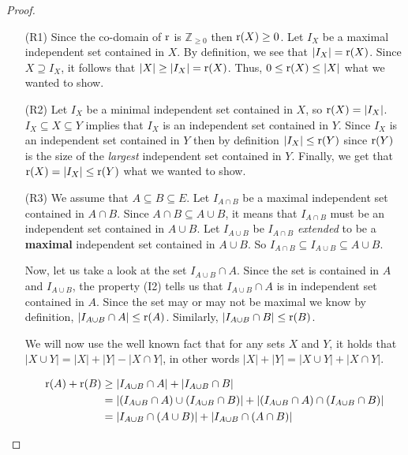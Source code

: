 \begin{proof}
    \begin{enumerate}
        \item[(R1)] Since the co-domain of $\operatorname{r}$ is $\mathbb{Z}_{\geq0}$ then  $\operatorname{r}(X) \geq 0$. Let $I_X$ be a maximal independent set contained in $X$. By definition, we see that $|I_X|=\operatorname{r}(X)$. Since $X\supseteq I_X$, it follows that $|X| \geq |I_X| = \operatorname{r}(X)$.       Thus, $0\leq\operatorname{r}(X)\leq|X|$ what we wanted to show.
        
        \item[(R2)] Let $I_X$ be a minimal independent set contained in $X$, so $\operatorname{r}(X)=|I_X|$. $I_X\subseteq X\subseteq Y$ implies that $I_X$ is an independent set contained in $Y$. Since $I_X$ is an independent set contained in $Y$ then by definition $|I_X|\leq \operatorname{r}(Y)$ since $\operatorname{r}(Y)$ is the size of the \textit{largest} independent set contained in $Y$. Finally, we get that $\operatorname{r}(X)=|I_X|\leq \operatorname{r}(Y)$ what we wanted to show.
        
        \item[(R3)] We assume that $A\subseteq B\subseteq E$. Let $I_{A\cap B}$ be a maximal independent set contained in $A\cap B$. Since $A\cap B\subseteq A\cup B$, it means that $I_{A\cap B}$ must be an independent set contained in $A\cup B$. Let $I_{A\cup B}$ be $I_{A\cap B}$ \textit{extended} to be a \textbf{maximal} independent set contained in $A\cup B$. So $I_{A\cap B}\subseteq I_{A\cup B} \subseteq A\cup B$. 
        
        Now, let us take a look at the set $I_{A\cup B}\cap A$. Since the set is contained in $A$ and $I_{A\cup B}$, the property (I2) tells us that $I_{A\cup B}\cap A$ is in independent set contained in $A$. Since the set may or may not be maximal we know by definition, $|I_{A\cup B}\cap A|\leq \operatorname{r}(A)$. Similarly, $|I_{A\cup B}\cap B|\leq \operatorname{r}(B) $.

        We will now use the well known fact that for any sets $X$ and $Y$, it holds that $|X\cup Y|=|X|+|Y|-|X\cap Y|$, in other words $|X|+|Y|=|X\cup Y|+|X\cap Y|$.
        
        \begin{align*}
            \operatorname{r}(A)+\operatorname{r}(B) &\geq |I_{A\cup B}\cap A|+|I_{A\cup B}\cap B| 
            \\&=  |(I_{A\cup B}\cap A)\cup(I_{A\cup B}\cap B)|
             +|(I_{A\cup B}\cap A)\cap(I_{A\cup B}\cap B)| 
            \\&=  |I_{A\cup B}\cap (A\cup B)|+|I_{A\cup B}\cap (A\cap B)| 
        \end{align*}


\end{enumerate}
\end{proof}
